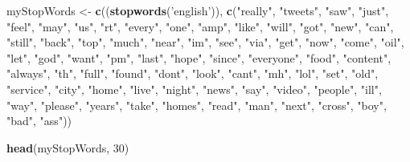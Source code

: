 \documentclass[
]{article}
\newenvironment{Shaded}{\begin{snugshade}}{\end{snugshade}}
\newcommand{\DecValTok}[1]{\textcolor[rgb]{0.00,0.00,0.81}{#1}}
\newcommand{\KeywordTok}[1]{\textcolor[rgb]{0.13,0.29,0.53}{\textbf{#1}}}
\newcommand{\NormalTok}[1]{#1}
\newcommand{\StringTok}[1]{\textcolor[rgb]{0.31,0.60,0.02}{#1}}
\begin{document}
\begin{Shaded}
\begin{Highlighting}[]
\NormalTok{myStopWords <-}\StringTok{ }\KeywordTok{c}\NormalTok{((}\KeywordTok{stopwords}\NormalTok{(}\StringTok{'english'}\NormalTok{)), }
    \KeywordTok{c}\NormalTok{(}\StringTok{"really"}\NormalTok{, }\StringTok{"tweets"}\NormalTok{, }\StringTok{"saw"}\NormalTok{, }\StringTok{"just"}\NormalTok{, }\StringTok{"feel"}\NormalTok{, }\StringTok{"may"}\NormalTok{, }\StringTok{"us"}\NormalTok{, }\StringTok{"rt"}\NormalTok{, }\StringTok{"every"}\NormalTok{, }\StringTok{"one"}\NormalTok{,}
     \StringTok{"amp"}\NormalTok{, }\StringTok{"like"}\NormalTok{, }\StringTok{"will"}\NormalTok{, }\StringTok{"got"}\NormalTok{, }\StringTok{"new"}\NormalTok{, }\StringTok{"can"}\NormalTok{, }\StringTok{"still"}\NormalTok{, }\StringTok{"back"}\NormalTok{, }\StringTok{"top"}\NormalTok{, }\StringTok{"much"}\NormalTok{,}
     \StringTok{"near"}\NormalTok{, }\StringTok{"im"}\NormalTok{, }\StringTok{"see"}\NormalTok{, }\StringTok{"via"}\NormalTok{, }\StringTok{"get"}\NormalTok{, }\StringTok{"now"}\NormalTok{, }\StringTok{"come"}\NormalTok{, }\StringTok{"oil"}\NormalTok{, }\StringTok{"let"}\NormalTok{, }\StringTok{"god"}\NormalTok{, }\StringTok{"want"}\NormalTok{,}
     \StringTok{"pm"}\NormalTok{, }\StringTok{"last"}\NormalTok{, }\StringTok{"hope"}\NormalTok{, }\StringTok{"since"}\NormalTok{, }\StringTok{"everyone"}\NormalTok{, }\StringTok{"food"}\NormalTok{, }\StringTok{"content"}\NormalTok{, }\StringTok{"always"}\NormalTok{, }\StringTok{"th"}\NormalTok{,}
     \StringTok{"full"}\NormalTok{, }\StringTok{"found"}\NormalTok{, }\StringTok{"dont"}\NormalTok{, }\StringTok{"look"}\NormalTok{, }\StringTok{"cant"}\NormalTok{, }\StringTok{"mh"}\NormalTok{, }\StringTok{"lol"}\NormalTok{, }\StringTok{"set"}\NormalTok{, }\StringTok{"old"}\NormalTok{, }\StringTok{"service"}\NormalTok{,}
     \StringTok{"city"}\NormalTok{, }\StringTok{"home"}\NormalTok{, }\StringTok{"live"}\NormalTok{, }\StringTok{"night"}\NormalTok{, }\StringTok{"news"}\NormalTok{, }\StringTok{"say"}\NormalTok{, }\StringTok{"video"}\NormalTok{, }\StringTok{"people"}\NormalTok{, }\StringTok{"ill"}\NormalTok{, }
     \StringTok{"way"}\NormalTok{,  }\StringTok{"please"}\NormalTok{, }\StringTok{"years"}\NormalTok{, }\StringTok{"take"}\NormalTok{, }\StringTok{"homes"}\NormalTok{, }\StringTok{"read"}\NormalTok{, }\StringTok{"man"}\NormalTok{, }\StringTok{"next"}\NormalTok{, }\StringTok{"cross"}\NormalTok{, }
     \StringTok{"boy"}\NormalTok{, }\StringTok{"bad"}\NormalTok{, }\StringTok{"ass"}\NormalTok{))}

\KeywordTok{head}\NormalTok{(myStopWords, }\DecValTok{30}\NormalTok{)}
\end{Highlighting}
\end{Shaded}
\end{document}
